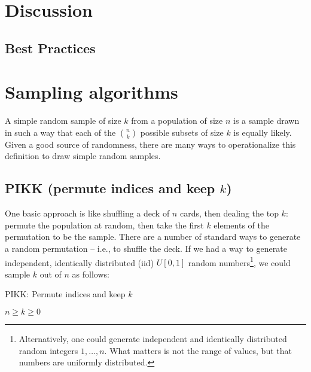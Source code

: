\documentclass[12pt]{article}
\begin{document}
\section{Discussion}
\subsection{Best Practices}




\appendix


\section{Sampling algorithms}
A simple random sample of size $k$ from a population of size $n$ is a sample drawn in such a way that each of the ${n \choose k}$ possible subsets of size $k$ is equally likely.
Given a good source of randomness, there are many ways to operationalize this definition to draw simple random samples.

\subsection{PIKK (permute indices and keep $k$)}
One basic approach is like shuffling a deck of $n$ cards, then dealing the top $k$: permute the population at random, then take the first $k$ elements of the permutation to be the sample.
There are a number of standard ways to generate a random permutation -- i.e., to shuffle the deck.
If we had a way to generate independent, identically distributed (iid) $U[0,1]$ random numbers\footnote{
Alternatively, one could generate independent and identically distributed random integers $1, \dots, n$.
What matters is not the range of values, but that numbers are uniformly distributed.}, we could sample $k$ out of $n$ as follows:

\begin{algorithm}                      %
\caption{PIKK: Permute indices and keep $k$}          %
\label{PIKK}                           %
\begin{algorithmic}[1]               %
    \Require $n \geq k \geq 0$
    \Statex
\end{algorithmic}
\end{algorithm}
\end{document}

